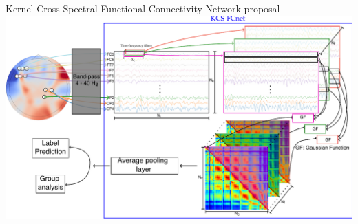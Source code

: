 \documentclass[aspectratio=169]{beamer}
\begin{document}
\begin{frame}{Kernel Cross-Spectral Functional Connectivity Network proposal}
    \centering
    \includegraphics[scale=0.5]{../Tesis_document/Figures/outline_and_contributions/contribution2.pdf}
\end{frame}
\end{document}
